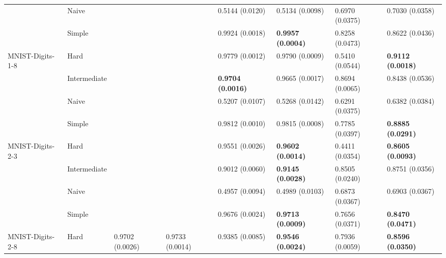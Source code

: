 \begin{tabular}{llllllll}
                 & Naive &                           &                           &           0.5144 (0.0120) &           0.5134 (0.0098) &           0.6970 (0.0375) &           0.7030 (0.0358) \\
                 & Simple &                           &                           &           0.9924 (0.0018) &  \textbf{0.9957 (0.0004)} &           0.8258 (0.0473) &           0.8622 (0.0436) \\
MNIST-Digits-1-8 & Hard &                           &                           &           0.9779 (0.0012) &           0.9790 (0.0009) &           0.5410 (0.0544) &  \textbf{0.9112 (0.0018)} \\
                 & Intermediate &                           &                           &  \textbf{0.9704 (0.0016)} &           0.9665 (0.0017) &           0.8694 (0.0065) &           0.8438 (0.0536) \\
                 & Naive &                           &                           &           0.5207 (0.0107) &           0.5268 (0.0142) &           0.6291 (0.0375) &           0.6382 (0.0384) \\
                 & Simple &                           &                           &           0.9812 (0.0010) &           0.9815 (0.0008) &           0.7785 (0.0397) &  \textbf{0.8885 (0.0291)} \\
MNIST-Digits-2-3 & Hard &                           &                           &           0.9551 (0.0026) &  \textbf{0.9602 (0.0014)} &           0.4411 (0.0354) &  \textbf{0.8605 (0.0093)} \\
                 & Intermediate &                           &                           &           0.9012 (0.0060) &  \textbf{0.9145 (0.0028)} &           0.8505 (0.0240) &           0.8751 (0.0356) \\
                 & Naive &                           &                           &           0.4957 (0.0094) &           0.4989 (0.0103) &           0.6873 (0.0367) &           0.6903 (0.0367) \\
                 & Simple &                           &                           &           0.9676 (0.0024) &  \textbf{0.9713 (0.0009)} &           0.7656 (0.0371) &  \textbf{0.8470 (0.0471)} \\
MNIST-Digits-2-8 & Hard &           0.9702 (0.0026) &           0.9733 (0.0014) &           0.9385 (0.0085) &  \textbf{0.9546 (0.0024)} &           0.7936 (0.0059) &  \textbf{0.8596 (0.0350)} \\

\end{tabular}
